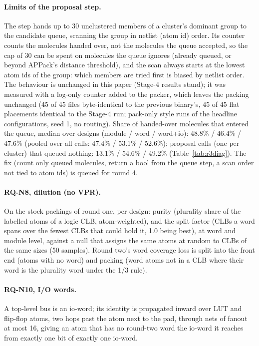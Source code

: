 \paragraph{Limits of the proposal step.} The step hands up to 30 unclustered members of a cluster's dominant
group to the candidate queue, scanning the group in netlist (atom id) order. Its counter counts the molecules handed over, not
the molecules the queue accepted, so the cap of 30 can be spent on molecules the queue ignores (already queued, or beyond
APPack's distance threshold), and the scan always starts at the lowest atom ids of the group: which members are tried first is
biased by netlist order. The behaviour is unchanged in this paper (Stage-4 results stand); it was measured with a log-only counter
added to the packer, which leaves the packing unchanged (45 of 45  files byte-identical to the previous binary's, 45 of 45 flat placements identical to the Stage-4 run; pack-only style runs of the headline configurations, seed 1,
no routing). Share of handed-over molecules that entered the queue, median over designs (module / word / word+io): 48.8\% / 46.4\% / 47.6\%
(pooled over all calls: 47.4\% / 53.1\% / 52.6\%); proposal calls (one per cluster) that queued nothing: 13.1\% / 54.6\% / 49.2\% (Table~\ref{tab:r3diag}).
The fix (count only queued molecules, return a bool from the queue step, a scan order not tied to atom ids) is queued for round 4.


\paragraph{RQ-N8, dilution (no VPR).} On the stock packings of round one, per design: purity (plurality share of the
labelled atoms of a logic CLB, atom-weighted), and the split factor (CLBs a word spans over the fewest CLBs that
could hold it, 1.0 being best), at word and module level, against a null that assigns the same atoms at random to
CLBs of the same sizes (50 samples). Round two's word coverage loss is split into the front end (atoms with no
word) and packing (word atoms not in a CLB where their word is the plurality word under the 1/3 rule).

\paragraph{RQ-N10, I/O words.} A top-level bus  is an io-word; its identity is propagated inward
over LUT and flip-flop atoms, two hops past the atom next to the pad, through nets of fanout at most 16, giving
an atom that has no round-two word the io-word it reaches from exactly one bit of exactly one io-word.

